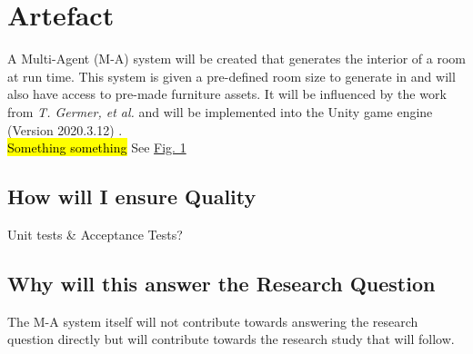 \section{Artefact}

A Multi-Agent (M-A) system will be created that generates the interior of a room at run time. This system is given a pre-defined room size to generate in and will also have access to pre-made furniture assets. It will be influenced by the work from \textit{T. Germer, et al.} \cite{real-time-walkthroughs} and will be implemented into the Unity game engine (Version 2020.3.12) \cite{unity}.
\\
\hl{Something something} See \hyperref[append:b]{Fig. 1}





\subsection{How will I ensure Quality}
Unit tests \& Acceptance Tests?

\subsection{Why will this answer the Research Question}
The M-A system itself will not contribute towards answering the research question directly but will contribute towards the research study that will follow. 

